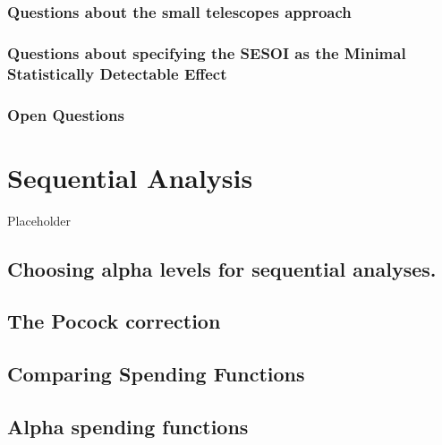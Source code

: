 \documentclass[
  oneside]{krantz}
\begin{document}
\hypertarget{questions-about-the-small-telescopes-approach}{%
\subsubsection{Questions about the small telescopes
approach}\label{questions-about-the-small-telescopes-approach}}

\hypertarget{questions-about-specifying-the-sesoi-as-the-minimal-statistically-detectable-effect}{%
\subsubsection{Questions about specifying the SESOI as the Minimal
Statistically Detectable
Effect}\label{questions-about-specifying-the-sesoi-as-the-minimal-statistically-detectable-effect}}

\hypertarget{open-questions-7}{%
\subsubsection{Open Questions}\label{open-questions-7}}

\hypertarget{sequential}{%
\section{Sequential Analysis}\label{sequential}}

Placeholder

\hypertarget{choosing-alpha-levels-for-sequential-analyses.}{%
\subsection{Choosing alpha levels for sequential
analyses.}\label{choosing-alpha-levels-for-sequential-analyses.}}

\hypertarget{the-pocock-correction}{%
\subsection{The Pocock correction}\label{the-pocock-correction}}

\hypertarget{comparing-spending-functions}{%
\subsection{Comparing Spending
Functions}\label{comparing-spending-functions}}

\hypertarget{alpha-spending-functions}{%
\subsection{Alpha spending functions}\label{alpha-spending-functions}}
\end{document}
